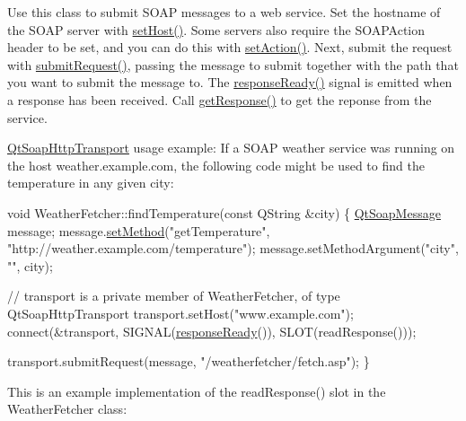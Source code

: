 Use this class to submit S\+O\+AP messages to a web service. Set the hostname of the S\+O\+AP server with \mbox{\hyperlink{class_qt_soap_http_transport_a7dfb69fe0e076407cda0093ee99c4988}{set\+Host()}}. Some servers also require the S\+O\+A\+P\+Action header to be set, and you can do this with \mbox{\hyperlink{class_qt_soap_http_transport_af370cf7ff31756ebdc2bb48b2ecb3663}{set\+Action()}}. Next, submit the request with \mbox{\hyperlink{class_qt_soap_http_transport_a6b49c608e9eb6af98b7258c8a59c5005}{submit\+Request()}}, passing the message to submit together with the path that you want to submit the message to. The \mbox{\hyperlink{class_qt_soap_http_transport_a51f909d36a83ee62e0b3dccff3e340cf}{response\+Ready()}} signal is emitted when a response has been received. Call \mbox{\hyperlink{class_qt_soap_http_transport_a85f606ff295d200c387e85a710692c59}{get\+Response()}} to get the reponse from the service.

\mbox{\hyperlink{class_qt_soap_http_transport}{Qt\+Soap\+Http\+Transport}} usage example\+: If a S\+O\+AP weather service was running on the host weather.\+example.\+com, the following code might be used to find the temperature in any given city\+:


\begin{DoxyCode}
\textcolor{keywordtype}{void} WeatherFetcher::findTemperature(\textcolor{keyword}{const} QString &city)
\{
    \mbox{\hyperlink{class_qt_soap_message}{QtSoapMessage}} message;
    message.\mbox{\hyperlink{class_qt_soap_message_a792f4e366d4bf4c3ca09ea6f034237b5}{setMethod}}(\textcolor{stringliteral}{"getTemperature"}, \textcolor{stringliteral}{"http://weather.example.com/temperature"});
    message.setMethodArgument(\textcolor{stringliteral}{"city"}, \textcolor{stringliteral}{""}, city);

    \textcolor{comment}{// transport is a private member of WeatherFetcher, of type QtSoapHttpTransport}
    transport.setHost(\textcolor{stringliteral}{"www.example.com"});
    connect(&transport, SIGNAL(\mbox{\hyperlink{class_qt_soap_http_transport_a51f909d36a83ee62e0b3dccff3e340cf}{responseReady}}()), SLOT(readResponse()));

    transport.submitRequest(message, \textcolor{stringliteral}{"/weatherfetcher/fetch.asp"});
\}
\end{DoxyCode}


This is an example implementation of the read\+Response() slot in the Weather\+Fetcher class\+:


